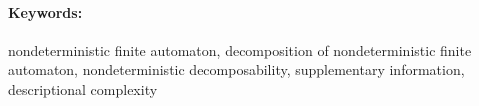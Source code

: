 \documentclass[12pt, oneside]{book}
\begin{document}
\paragraph*{Keywords:} nondeterministic finite automaton, decomposition of nondeterministic finite automaton, nondeterministic decomposability, supplementary information, descriptional complexity


%
%



\newpage 

\tableofcontents



\newpage 

\listoffigures


\mainmatter
















\newpage	

\backmatter

\thispagestyle{empty}
\nocite{*}
\clearpage




 
\end{document}
